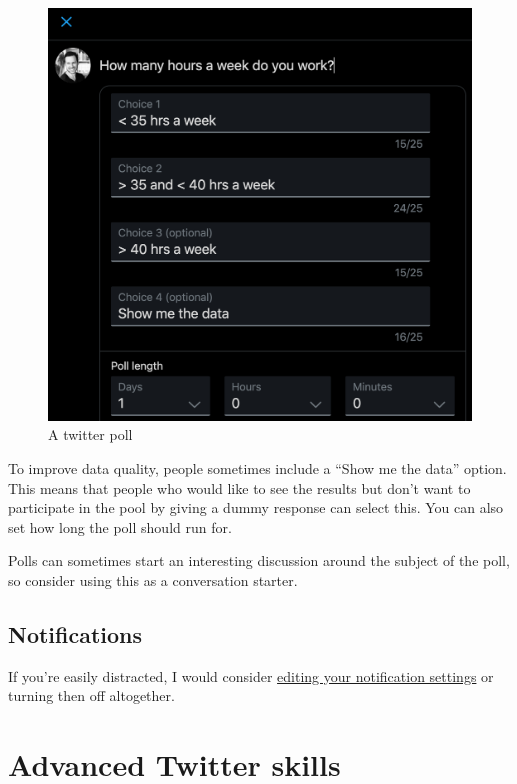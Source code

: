 \documentclass[]{book}
\begin{document}
\begin{figure}

{\centering \includegraphics[width=0.8\linewidth]{images/poll} 

}

\caption{A twitter poll}\label{fig:poll}
\end{figure}

To improve data quality, people sometimes include a ``Show me the data'' option. This means that people who would like to see the results but don't want to participate in the pool by giving a dummy response can select this. You can also set how long the poll should run for.

Polls can sometimes start an interesting discussion around the subject of the poll, so consider using this as a conversation starter.

\hypertarget{notifications}{%
\section{Notifications}\label{notifications}}

If you're easily distracted, I would consider \href{https://help.twitter.com/en/managing-your-account/notifications-on-mobile-devices}{editing your notification settings} or turning then off altogether.

\hypertarget{advanced-twitter-skills}{%
\chapter{Advanced Twitter skills}\label{advanced-twitter-skills}}
\end{document}

